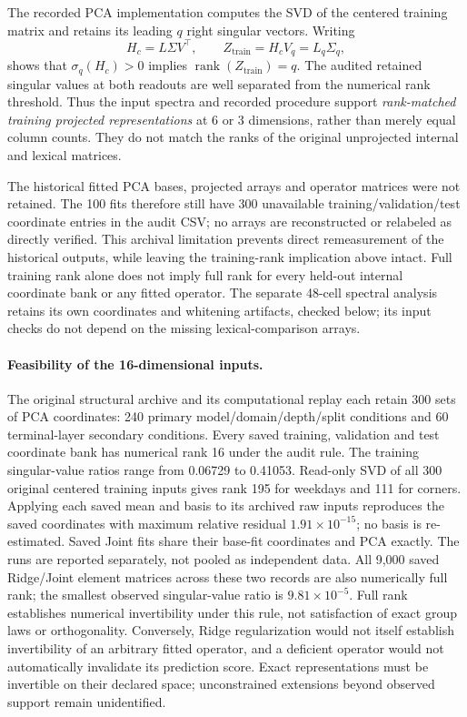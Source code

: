 The recorded PCA implementation computes the SVD of the centered training matrix and retains its leading $q$ right singular vectors. Writing
\[
 H_c=L\Sigma V^\top,\qquad
 Z_{\mathrm{train}}=H_cV_q=L_q\Sigma_q,
\]
shows that $\sigma_q(H_c)>0$ implies $\operatorname{rank}(Z_{\mathrm{train}})=q$. The audited retained singular values at both readouts are well separated from the numerical rank threshold. Thus the input spectra and recorded procedure support \emph{rank-matched training projected representations} at 6 or 3 dimensions, rather than merely equal column counts. They do not match the ranks of the original unprojected internal and lexical matrices.

The historical fitted PCA bases, projected arrays and operator matrices were not retained. The 100 fits therefore still have 300 unavailable training/validation/test coordinate entries in the audit CSV; no arrays are reconstructed or relabeled as directly verified. This archival limitation prevents direct remeasurement of the historical outputs, while leaving the training-rank implication above intact. Full training rank alone does not imply full rank for every held-out internal coordinate bank or any fitted operator. The separate 48-cell spectral analysis retains its own coordinates and whitening artifacts, checked below; its input checks do not depend on the missing lexical-comparison arrays.

\paragraph{Feasibility of the 16-dimensional inputs.}
The original structural archive and its computational replay each retain 300 sets of PCA coordinates: 240 primary model/domain/depth/split conditions and 60 terminal-layer secondary conditions. Every saved training, validation and test coordinate bank has numerical rank 16 under the audit rule. The training singular-value ratios range from 0.06729 to 0.41053. Read-only SVD of all 300 original centered training inputs gives rank 195 for weekdays and 111 for corners. Applying each saved mean and basis to its archived raw inputs reproduces the saved coordinates with maximum relative residual $1.91\times10^{-15}$; no basis is re-estimated. Saved Joint fits share their base-fit coordinates and PCA exactly. The runs are reported separately, not pooled as independent data. All 9,000 saved Ridge/Joint element matrices across these two records are also numerically full rank; the smallest observed singular-value ratio is $9.81\times10^{-5}$. Full rank establishes numerical invertibility under this rule, not satisfaction of exact group laws or orthogonality. Conversely, Ridge regularization would not itself establish invertibility of an arbitrary fitted operator, and a deficient operator would not automatically invalidate its prediction score. Exact representations must be invertible on their declared space; unconstrained extensions beyond observed support remain unidentified.

